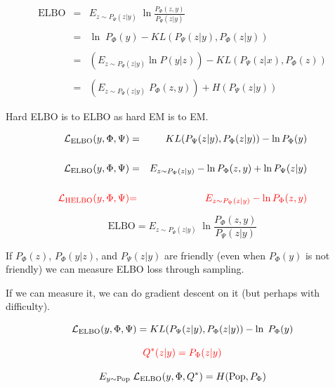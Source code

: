 {

\begin{eqnarray*}
\mathrm{ELBO} & = & E_{z \sim P_\Psi(z|y)}\; \ln \frac{P_\Phi(z,y)}{P_\Psi(z|y)} \\
 \\      
  & = &\ln\;P_{\Phi}(y) - KL(P_\Psi(z|y),P_{\Phi}(z|y)) \\
  \\
  & = & \left(E_{z \sim P_\Psi(z|y)} \ln P(y|z)\right) - KL(P_\Psi(z|x),P_\Phi(z)) \\
  \\
  & = & \left(E_{z\sim P_\Psi(z|y)} \;P_\Phi(z,y)\right) + H(P_\Psi(z|y))
\end{eqnarray*}


Hard ELBO is to ELBO as hard EM is to EM.


\vfill
\begin{eqnarray*}
{\cal L}_{\mathrm{ELBO}}(y,\Phi,\Psi) &  =  & KL(P_\Psi(z|y),P_\Phi(z|y)) - \ln P_\Phi(y) \\
\\
{\cal L}_{\mathrm{ELBO}}(y,\Phi,\Psi) &  =  & E_{z \sim P_\Psi(z|y)} - \ln P_\Phi(z,y) + \ln P_\Psi(z|y) \\
\\
{\color{red} {\cal L}_{\mathrm{HELBO}}(y,\Phi,\Psi)} & {\color{red}  =} & {\color{red}  E_{z \sim P_\Psi(z|y)} - \ln P_\Phi(z,y)}
\end{eqnarray*}


$$\mathrm{ELBO}  =  E_{z \sim P_\Psi(z|y)}\; \ln \frac{P_\Phi(z,y)}{P_\Psi(z|y)}$$

\vfill
If $P_\Phi(z)$, $P_\Phi(y|z)$, and $P_\Psi(z|y)$ are friendly (even when $P_\Phi(y)$ is not friendly) we can
measure ELBO loss through sampling.

\vfill
If we can measure it, we can do gradient descent on it (but perhaps with difficulty).


$${\cal L}_{\mathrm{ELBO}}(y,\Phi,\Psi) = KL(P_\Psi(z|y),P_{\Phi}(z|y)) - \ln\;P_{\Phi}(y)$$

\vfill
$${\color{red} Q^*(z|y) = P_\Phi(z|y)}$$

\vfill
$$E_{y \sim \mathrm{Pop}}\;{\cal L}_{\mathrm{ELBO}}(y,\Phi,Q^*) = H(\mathrm{Pop},P_\Phi)$$


}
